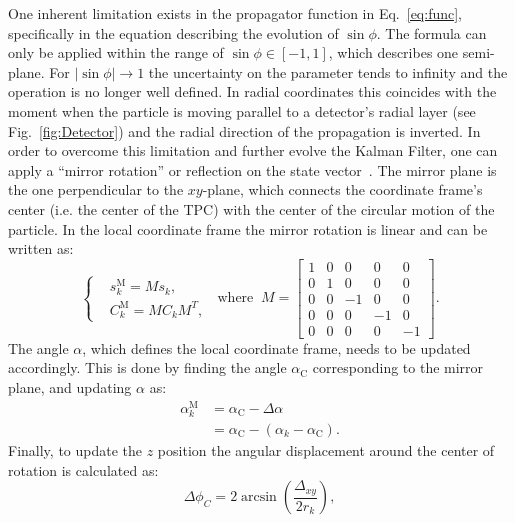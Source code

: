 One inherent limitation exists in the propagator function in Eq.~\ref{eq:func}, specifically in the equation describing the evolution of $\sin \phi$. The formula can only be applied within the range of $\sin \phi \in [-1,1]$, which describes one semi-plane. For $|\sin \phi|\rightarrow1$ the uncertainty on the parameter tends to infinity and the operation is no longer well defined. In radial coordinates this coincides with the moment when the particle is moving parallel to a detector's radial layer (see Fig.~\ref{fig:Detector}) and the radial direction of the propagation is inverted. In order to overcome this limitation and further evolve the Kalman Filter, one can apply a \enquote{mirror rotation} or reflection on the state vector~\cite{lay2003linear}. The mirror plane is the one perpendicular to the $xy$-plane,  which connects the coordinate frame's center (i.e. the center of the TPC) with the center of the circular motion of the particle. In the local coordinate frame the mirror rotation is linear and can be written as:
\begin{equation}\label{eq:mirror}
    \left\{
    \begin{aligned}
        &s_k^\textrm{M} = M s_k,\\
        &C_k^\textrm{M} = M C_k M^T,
    \end{aligned}
    \right.
    \;\; \textrm{where} \;\;
    M=\begin{bmatrix}
    1 & 0 & 0 & 0& 0 \\
    0 & 1 & 0 & 0& 0 \\
    0 & 0 & -1 & 0& 0 \\
    0 & 0 & 0 & -1& 0 \\
    0 & 0 & 0 & 0& -1 
    \end{bmatrix}.
\end{equation}
The angle $\alpha$, which defines the local coordinate frame, needs to be updated accordingly. This is done by finding the angle $\alpha_\textrm{C}$ corresponding to the mirror plane, and updating $\alpha$ as:
\begin{equation}
    \begin{aligned}
       \alpha _k^\textrm{M} &=\alpha_\textrm{C}-\Delta \alpha \\
                   &= \alpha_\textrm{C}-(\alpha_k-\alpha_\textrm{C}).
    \end{aligned}   
\end{equation} 
Finally, to update the $z$ position the angular displacement around the center of rotation is calculated as:
\begin{equation}
    \Delta \phi_C = 2\arcsin \left( \frac{\Delta_{xy}}{2r_k} \right),
\end{equation}

